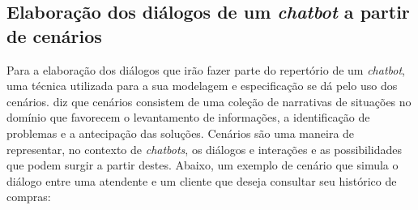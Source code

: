 \subsection{Elaboração dos diálogos de um \textit{chatbot} a partir de cenários}\label{texto:elaborando-dialogos}

Para a elaboração dos diálogos que irão fazer parte do repertório de um \textit{chatbot}, uma técnica utilizada para a sua modelagem e especificação se dá pelo uso dos cenários.
 diz que cenários consistem de uma coleção de narrativas de situações no domínio que favorecem o levantamento de informações, a identificação de problemas e a antecipação das soluções.
Cenários são uma maneira de representar, no contexto de \textit{chatbots}, os diálogos e interações e as possibilidades que podem surgir a partir destes. Abaixo, um exemplo de cenário que simula o diálogo entre uma atendente e um cliente que deseja consultar seu histórico de compras:


